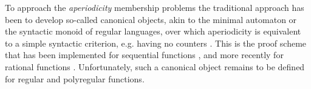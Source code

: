 

\AP To approach the \emph{aperiodicity} membership problems the traditional
approach has been to develop so-called canonical objects, akin to the minimal
automaton or the syntactic monoid of regular languages, over which aperiodicity
is equivalent to a simple syntactic criterion, e.g. having no counters
\cite{MNPA71}. This is the proof scheme that has been implemented for
sequential functions \cite{CHOF03}, and more recently for rational functions
\cite{FGL16,FGLM18}. Unfortunately, such a canonical object remains to be
defined for regular and polyregular functions.


